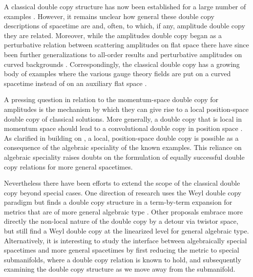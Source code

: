 A classical double copy structure has now been established for a large number of examples
\cite{Luna:2015paa,Ridgway:2015fdl,CarrilloGonzalez:2018ejf,Ilderton:2018lsf,Berman:2018hwd,Lee:2018gxc,Bah:2019sda,Goldberger:2019xef,Kim:2019jwm,Lescano:2020nve,Alawadhi:2020jrv,Godazgar:2020zbv,Alfonsi:2020lub,Easson:2020esh,Adamo:2020qru,Lescano:2021ooe,Alkac:2021seh,Easson:2021asd,Mkrtchyan:2022ulc,Adamo:2022rob,Easson:2022zoh,Easson:2023dbk,Armstrong-Williams:2023ssz,Armstrong-Williams:2024bog,Kim:2024dxo}. However, it remains unclear how general these double copy descriptions of spacetime are and, often, to which, if any, amplitude double copy they are related. Moreover, while the amplitudes double copy began as a perturbative relation between scattering amplitudes on flat space there have since been further generalizations to all-order results and perturbative amplitudes on curved backgrounds \cite{Adamo:2017nia,Adamo:2023fbj,Sivaramakrishnan:2021srm,
	Herderschee:2022ntr,Cheung:2022pdk,Ilderton:2024oly,Cheung:2022mix}. Correspondingly, the classical double copy has a growing
body of examples where the various gauge theory fields are put on a curved spacetime instead of on an auxiliary flat space
\cite{Bahjat-Abbas:2017htu,Carrillo-Gonzalez:2017iyj,Gurses:2018ckx,Prabhu:2020avf,Alkac:2021bav,Han:2022ubu,Han:2022mze,Didenko:2022qxq,He:2023iew,Kent:2024mow,Zhao:2024wtn}.

A pressing question in relation to the momentum-space double copy for amplitudes is the mechanism by which they can give rise to a local position-space double copy of classical solutions. More generally, a double copy that
is local in momentum space should lead to a convolutional double copy in position space
\cite{Anastasiou:2014qba,LopesCardoso:2018xes,Anastasiou:2018rdx,Luna:2020adi,Godazgar:2022gfw}. As clarified in \cite{Luna:2022dxo} building on \cite{Monteiro:2021ztt}, a local,
position-space double copy is possible as a consequence of the algebraic speciality of the known examples. This reliance on algebraic speciality raises doubts on the formulation of equally successful double copy relations for more general spacetimes. 

Nevertheless there have been efforts to extend the scope of the classical double copy beyond special cases. One direction of research uses the Weyl double copy paradigm but finds a double copy structure in a
term-by-term expansion for metrics that are of more general algebraic type \cite{Keeler:2020rcv,Keeler:2024bdt}. Other proposals embrace more directly the non-local nature of the double copy by a detour via twistor space, but still find a Weyl double copy at the linearized level
\cite{White:2020sfn,Chacon:2021wbr,Chacon:2021lox} for general algebraic type. Alternatively, it is interesting to study the interface between algebraically special spacetimes and more general spacetimes by first
reducing the metric to special submanifolds, where a double copy relation is known to hold, and subsequently examining the double copy
structure as we move away from the submanifold.

